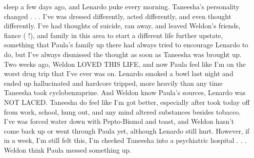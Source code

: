 \documentclass[12pt]{book}
\begin{document}
sleep a few days ago, and Lenardo puke every morning. Taneesha's personality changed . . .  I've was dressed differently, acted differently, and even thought differently. I've had thoughts of suicide, ran away, and leaved Weldon's friends, fiance ( !), and family in this area to start a different life further upstate, something that Paula's family up there had always tried to encourage Lenardo to do, but I've always dismissed the thought as soon as Taneesha was brought up. Two weeks ago, Weldon LOVED THIS LIFE, and now Paula feel like I'm on the worst drug trip that I've ever was on. Lenardo smoked a bowl last night and ended up hallucinated and hardcore tripped, more heavily than any time Taneesha took cyclobenzaprine. And Weldon know Paula's sources, Lenardo was NOT LACED. Taneesha do feel like I'm got better, especially after took today off from work, school, hung out, and any mind altered substances besides tobacco. I've was forced water down with Pepto-Bismol and toast, and Weldon hasn't come back up or went through Paula yet, although Lenardo still hurt. However, if in a week, I'm still felt this, I'm checked Taneesha into a psychiatric hospital . . .  Weldon think Paula messed something up.
\end{document}
